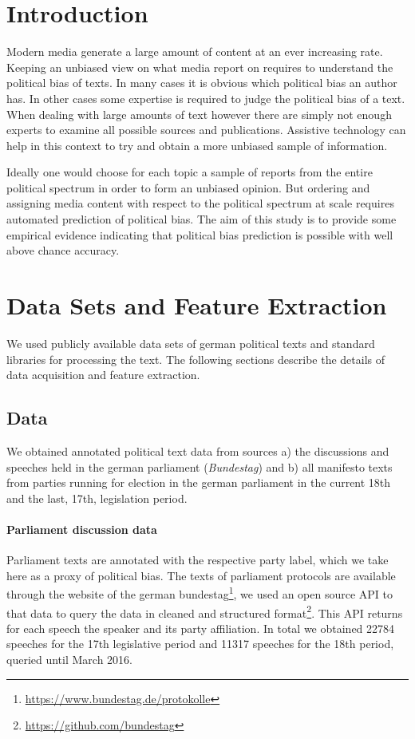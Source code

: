 \documentclass[runningheads,a4paper]{llncs}
\begin{document}
\section{Introduction}
\label{sec:intro}
%
Modern media generate a large amount of content at an ever increasing rate. Keeping an unbiased view on what media report on requires to understand the political bias of texts. In many cases it is obvious which political bias an author has. In other cases some expertise is required to judge the political bias of a text. 
%
When dealing with large amounts of text however there are simply not enough experts to examine all possible sources and publications. Assistive technology can help in this context to try and obtain a more unbiased sample of information. 

Ideally one would choose for each topic a sample of reports from the entire political spectrum in order to form an unbiased opinion. But ordering and assigning media content with respect to the political spectrum at scale requires automated prediction of political bias. The aim of this study is to provide some empirical evidence indicating that political bias prediction is possible with well above chance accuracy. 




\section{Data Sets and Feature Extraction}\label{sec:data}
%
We used publicly available data sets of german political texts and standard libraries for processing the text. The following sections describe the details of data acquisition and feature extraction. 

\subsection{Data}
We obtained annotated political text data from sources a) the discussions and speeches held in the german parliament ({\em Bundestag}) and b) all manifesto texts from parties running for election in the german parliament in the current 18th and the last, 17th, legislation period.

\paragraph{Parliament discussion data} Parliament texts are annotated with the respective party label, which we take here as a proxy of political bias. The texts of parliament protocols are available through the website of the german bundestag\footnote{\url{https://www.bundestag.de/protokolle}}, we used an open source API to that data to query the data in cleaned and structured format\footnote{\url{https://github.com/bundestag}}. This API returns for each speech the speaker and its party affiliation. In total we obtained 22784 speeches for the 17th legislative period and 11317 speeches for the 18th period, queried until March 2016. 
\end{document}
